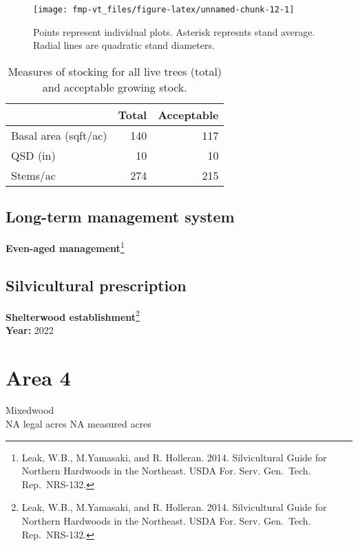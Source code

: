 \documentclass[]{tufte-handout}
\begin{document}
\begin{figure}
\texttt{[image: fmp-vt\_files/figure-latex/unnamed-chunk-12-1]} \caption[Points represent individual plots]{Points represent individual plots. Asterisk represnts stand average. Radial lines are quadratic stand diameters.}\label{fig:unnamed-chunk-12}
\end{figure}

\begin{table}

\caption{\label{tab:unnamed-chunk-13}Measures of stocking for all live trees (total) and acceptable growing stock.}
\centering
\begin{tabular}[t]{lrr}
\toprule
  & Total & Acceptable\\
\midrule
Basal area (sqft/ac) & 140 & 117\\
QSD (in) & 10 & 10\\
Stems/ac & 274 & 215\\
\bottomrule
\end{tabular}
\end{table}

\subsection{Long-term management
system}\label{long-term-management-system-2}

\textbf{Even-aged management}\footnote{Leak, W.B., M.Yamasaki, and R.
  Holleran. 2014. Silvicultural Guide for Northern Hardwoods in the
  Northeast. USDA For. Serv. Gen.~Tech. Rep.~NRS-132.}

\subsection{Silvicultural
prescription}\label{silvicultural-prescription-2}

\textbf{Shelterwood establishment}\footnote{Leak, W.B., M.Yamasaki, and
  R. Holleran. 2014. Silvicultural Guide for Northern Hardwoods in the
  Northeast. USDA For. Serv. Gen.~Tech. Rep.~NRS-132.}\\
\textbf{Year:} 2022

\newpage

\section{Area 4}\label{area-4}

Mixedwood\\
\noindent NA legal acres \textbar{} NA measured acres
\end{document}
